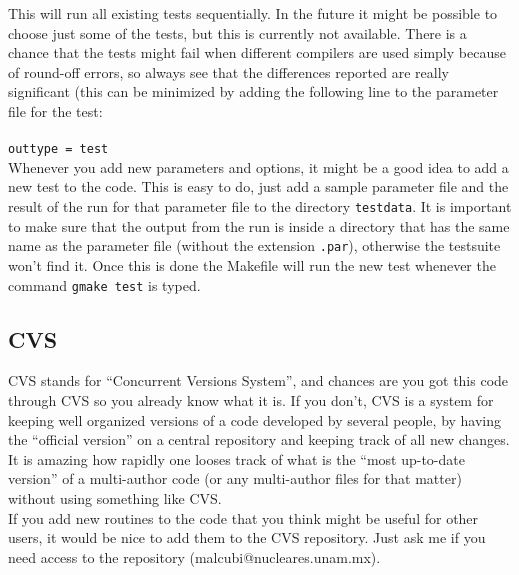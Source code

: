 \documentclass[12pt]{article}
\begin{document}
This will run all existing tests sequentially.  In the future it might
be possible to choose just some of the tests, but this is currently
not available.  There is a chance that the tests might fail when
different compilers are used simply because of round-off errors, so
always see that the differences reported are really significant (this
can be minimized by adding the following line to the parameter file
for the test: \\ \\
\texttt{outtype = test} \\

Whenever you add new parameters and options, it might be a good idea to
add a new test to the code.  This is easy to do, just add a sample
parameter file and the result of the run for that parameter file to
the directory \texttt{testdata}. It is important to make sure that the
output from the run is inside a directory that has the same name as
the parameter file (without the extension \texttt{.par}), otherwise
the testsuite won't find it.  Once this is done the Makefile will run
the new test whenever the command \texttt{gmake test} is typed.


\subsection{CVS}

CVS stands for ``Concurrent Versions System'', and chances are you got
this code through CVS so you already know what it is.  If you don't,
CVS is a system for keeping well organized versions of a code
developed by several people, by having the ``official version'' on a
central repository and keeping track of all new changes. It is amazing
how rapidly one looses track of what is the ``most up-to-date
version'' of a multi-author code (or any multi-author files for that
matter) without using something like CVS. \\

If you add new routines to the code that you think might be useful for
other users, it would be nice to add them to the CVS repository.  Just
ask me if you need access to the repository (malcubi@nucleares.unam.mx).








\end{document}
